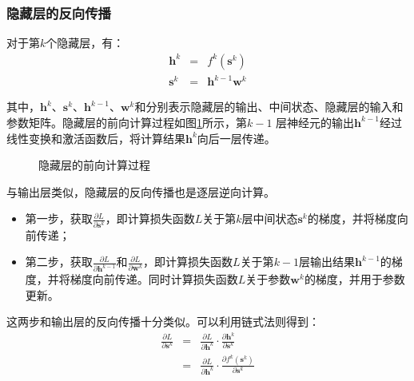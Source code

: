 
\subsubsection{隐藏层的反向传播}

\parinterval  对于第$ k $个隐藏层，有：
\begin{eqnarray}
\mathbf h^k&=&f^k(\mathbf s^k) \label{eq:5-52}\\
\mathbf s^k&=&\mathbf h^{k-1}\mathbf w^k
\label{eq:5-53}
\end{eqnarray}

\noindent  其中，$ \mathbf h^k $、$ \mathbf s^k $、$ \mathbf h^{k-1} $、$\mathbf w^k $和分别表示隐藏层的输出、中间状态、隐藏层的输入和参数矩阵。隐藏层的前向计算过程如图\ref{fig:5-56}所示，第$ k-1 $ 层神经元的输出$ \mathbf h^{k-1} $经过线性变换和激活函数后，将计算结果$ \mathbf h^k $向后一层传递。

\begin{figure}[htp]
\centering

\caption{隐藏层的前向计算过程}
\label{fig:5-56}
\end{figure}

\parinterval  与输出层类似，隐藏层的反向传播也是逐层逆向计算。

\begin{itemize}
\vspace{0.5em}
\item 第一步，获取$\frac{\partial L}{\partial \mathbf s^k} $，即计算损失函数$ L $关于第$ k $层中间状态$ \mathbf s^k$的梯度，并将梯度向前传递；
\vspace{0.5em}
\item 第二步，获取$\frac{\partial L}{\partial \mathbf h^{k-1}} $和$\frac{\partial L}{\partial \mathbf w^k} $，即计算损失函数$ L $关于第$ k-1 $层输出结果$ \mathbf h^{k-1} $的梯度，并将梯度向前传递。同时计算损失函数$ L $关于参数$ \mathbf w^k $的梯度，并用于参数更新。
\vspace{0.5em}
\end{itemize}

\parinterval  这两步和输出层的反向传播十分类似。可以利用链式法则得到：
\begin{eqnarray}
\frac{\partial L}{\partial \mathbf s^k}&=&\frac{\partial L}{\partial \mathbf h^k}\cdot \frac{\partial \mathbf h^k}{\partial \mathbf s^k}\nonumber\\
&=&\frac{\partial L}{\partial \mathbf h^k}\cdot \frac{\partial f^k(\mathbf s^k)}{\partial \mathbf s^k}
\label{eq:5-54}
\end{eqnarray}

